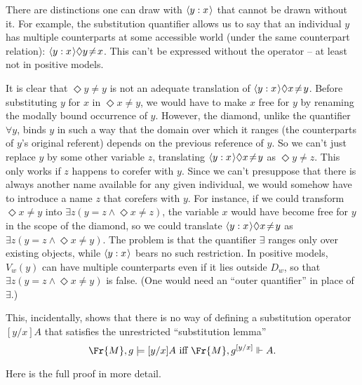 \documentclass[11pt]{woarticle}
\newcommand{\cmnt}[1]{\iffalse #1 \fi}
\theoremstyle{break}
\theoremstyle{nonumberplain}
\newcommand{\SAT}{\Vdash}
\newcommand{\1}{\;\,|\;\,}
\renewcommand{\t}[1]{\ensuremath{\langle #1  \makebox[.2ex]{}\rangle}}
\begin{document}
There are distinctions one can draw with $\t{y:x}$ that cannot be drawn without
it. For example, the substitution quantifier allows us to say that an individual
$y$ has multiple counterparts at some accessible world (under the same
counterpart relation): $\t{y:x}\Diamond y\!\not=\!x$. This can't be expressed
without the operator -- at least not in positive models.

It is clear that $\Diamond y\!\not=\!y$ is not an adequate translation of
$\t{y:x}\Diamond x\!\not=\!y$. Before substituting $y$ for $x$ in
$\Diamond x\!\not=\!y$, we would have to make $x$ free for $y$ by renaming the
modally bound occurrence of $y$. However, the diamond, unlike the quantifier
$\forall y$, binds $y$ in such a way that the domain over which it ranges (the
counterparts of $y$'s original referent) depends on the previous reference of
$y$. So we can't just replace $y$ by some other variable $z$, translating
$\t{y:x}\Diamond x\!\not=\!y$ as $\Diamond y\!\not=\!z$. This only works if $z$
happens to corefer with $y$. Since we can't presuppose that there is always
another name available for any given individual, we would somehow have to
introduce a name $z$ that corefers with $y$. For instance, if we could transform
$\Diamond x\!\not=\!y$ into $\exists z(y\!=\!z \land \Diamond x\!\not=\!z)$, the
variable $x$ would have become free for $y$ in the scope of the diamond, so we
could translate $\t{y:x}\Diamond x\!\not=\!y$ as
$\exists z(y\!=\!z \land \Diamond x\!\not=\!y)$. The problem is that the
quantifier $\exists$ ranges only over existing objects, while $\t{y:x}$ bears no
such restriction. In positive models, $V_w(y)$ can have multiple counterparts
even if it lies outside $D_w$, so that
$\exists z(y\!=\!z \land \Diamond x\!\not=\!y)$ is false.%
\cmnt{%
  It wouldn't help to use $\forall z(y\!=\!z \then A)$ instead, because that
  would translate \emph{any} statement $\t{y:x}A$ into something true in this
  scenario, even $\t{y:x}(P \land \neg P)$.%
} %
(One would need an ``outer quantifier'' in place of $\exists$.)

This, incidentally, shows that there is no way of defining a substitution
operator $[y/x]A$ that satisfies the unrestricted ``substitution lemma''
\begin{equation*}
  \Fr{M},g \models [y/x]A \text{ iff } \Fr{M},g^{[y/x]} \SAT A.
\end{equation*}

Here is the full proof in more detail.
\end{document}
